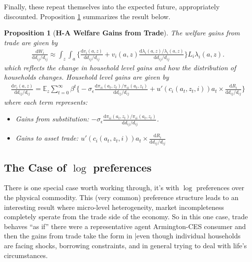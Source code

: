 \documentclass[12pt,pdftex]{article}
\newtheorem{prp}{Proposition}
\begin{document}
\begin{onehalfspacing}
Finally, these repeat themselves into the expected future, appropriately discounted. Proposition \ref{prp:gains-trade} summarizes the result below.
\begin{prp}[\textbf{H-A Welfare Gains from Trade}] \label{prp:gains-trade} The welfare gains from trade are given by
{\footnotesize
\begin{align}
\frac{\mathrm{d} W_{i}}{\mathrm{d} d_{ij} / d_{ij}} \approx \int_{z} \int_{a}  \bigg \{ \frac{\mathrm{d} v_i(a, z)}{\mathrm{d} d_{ij} / d_{ij}}  + v_{i}(a,z) \frac{\mathrm{d} \lambda_{i}(a,z)/ \lambda_{i}(a,z)}{\mathrm{d} d_{ij} / d_{ij}}  \bigg \} L_i \lambda_{i}(a,z).
\nonumber
\end{align}
}which reflects the change in household level gains and how the distribution of households changes. Household level gains are given by
{\footnotesize
\begin{align}
\nonumber
\frac{\mathrm{d} v_i(a, z)}{\mathrm{d} d_{ij} / d_{ij}} = \mathbb{E}_{z} \sum_{t = 0}^{\infty} \beta^{t} \bigg \{ -\sigma_{\epsilon} \frac{\mathrm{d} \pi_{ii}(a_{t},z_{t}) / \pi_{ii}(a_{t},z_{t})}{\mathrm{d}d_{ij} / d_{ij}} + u'(c_{i}(a_{t},z_{t},i))a_{t} \times \frac{\mathrm{d} R_{i}}{\mathrm{d} d_{ij} / d_{ij}} \bigg \}
\end{align}
}where each term represents:
\begin{itemize}
\item Gains from substitution: $-\sigma_{\epsilon} \frac{\mathrm{d} \pi_{ii}(a_{t},z_{t}) / \pi_{ii}(a_{t},z_{t})}{\mathrm{d}d_{ij} / d_{ij}}$.

\item Gains to asset trade: $u'(c_{i}(a_{t},z_{t}, i))a_{t} \times \frac{\mathrm{d} R_{i}}{\mathrm{d} d_{ij} / d_{ij}}$
\end{itemize}
\end{prp}

\subsection{The Case of $\log$ preferences}

There is one special case worth working through, it's with $\log$ preferences over the physical commodity. This (very common) preference structure leads to an interesting result where micro-level heterogeneity, market incompleteness completely sperate from the trade side of the economy. So in this one case, trade behaves ``as if'' there were a representative agent Armington-CES consumer and then the gains from trade take the form in \citet{arkolakis2012new}|even though individual households are facing shocks, borrowing constraints, and in general trying to deal with life's circumstances.


\end{onehalfspacing}
\end{document}
